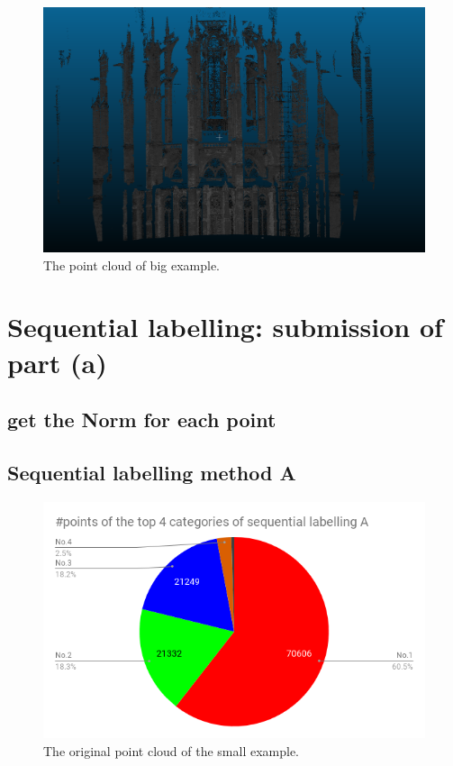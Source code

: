 \documentclass[a4paper,12pt]{article}
\begin{document}
  \begin{figure}[H]
  \begin{center}
      \includegraphics[scale=0.4]{big_example.png}
\end{center}
\caption{The point cloud of big example.}
 \label{fig:big}
 \end{figure}
\section{Sequential labelling: submission of part (a)}
\subsection{get the Norm for each point}
\subsection{Sequential labelling method A}
 \begin{figure}[H]
  \begin{center}
      \includegraphics[scale=0.6]{label_statis_seq_a.png}
\end{center}
\caption{The original point cloud of the small example.}
 \label{fig:sml_origin}
 \end{figure}
\end{document}
